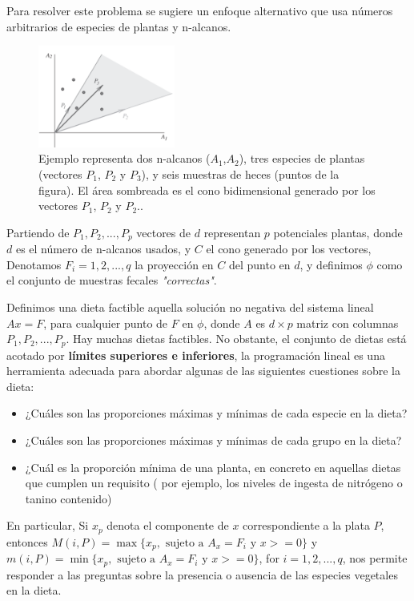 \documentclass[11pt]{article}
\begin{document}
Para resolver este problema se sugiere un enfoque alternativo que usa números arbitrarios de especies de plantas y n-alcanos.

\begin{figure}[h!] 
\centering
    \includegraphics[width=0.4\textwidth]{espacio03.png}
\caption{Ejemplo representa dos n-alcanos ($A_1$,$A_2$), tres especies de plantas (vectores $P_1$, $P_2$ y $P_3$), y seis muestras de heces (puntos de la figura). El área sombreada es el cono bidimensional generado por los vectores $P_1$, $P_2$ y $P_2$..}
\label{fig:espacio03}
\end{figure}

Partiendo de $P_1, P_2,...,P_p$ vectores de $d$ representan $p$ potenciales plantas, donde $d$ es el número de n-alcanos usados, y $C$ el cono generado por los vectores, Denotamos $F_i = 1,2,...,q$ la proyección en $C$ del punto en $d$, y definimos $\phi$ como el conjunto de muestras fecales \textit{"correctas"}.

Definimos una dieta factible aquella solución no negativa del sistema lineal $Ax=F$, para cualquier punto de $F$ en $\phi$, donde $A$ es $d \times p$ matriz con columnas $P_1, P_2,...,P_p$. Hay muchas dietas factibles. No obstante, el conjunto de dietas está acotado por \textbf{límites superiores e inferiores}, la programación lineal es una herramienta adecuada para abordar algunas de las siguientes cuestiones sobre la dieta:

\begin{itemize}
    \item ¿Cuáles son las proporciones máximas y mínimas de cada especie en la dieta?
    \item ¿Cuáles son las proporciones máximas y mínimas de cada grupo en la dieta?
    \item ¿Cuál es la proporción mínima de una planta, en concreto  en aquellas dietas que cumplen un requisito ( por ejemplo, los niveles de ingesta de nitrógeno o tanino contenido)
\end{itemize}

En particular, Si $x_p$ denota el componente de $x$ correspondiente a la plata $P$, entonces $M(i,P) = \max\{x_p, \text{ sujeto a } A_x = F_i \text{ y } x>=0\}$ y $m(i,P) = \min\{x_p, \text{ sujeto a } A_x=F_i \text{ y } x>=0\}$, for $i = 1,2,...,q$, nos permite responder a las preguntas sobre la presencia o ausencia de las especies vegetales en la dieta.
\end{document}
